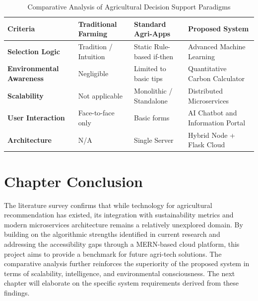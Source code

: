 \documentclass[12pt,a4paper]{report}
\begin{document}
\begin{table}[H]
    \centering
    \renewcommand{\arraystretch}{1.5}
    \begin{tabularx}{\textwidth}{|p{3cm}|X|X|X|}
        \hline
        \textbf{Criteria} & \textbf{Traditional Farming} & \textbf{Standard Agri-Apps} & \textbf{Proposed System} \\
        \hline
        \textbf{Selection Logic} & Tradition / Intuition & Static Rule-based if-then & Advanced Machine Learning \\
        \hline
        \textbf{Environmental Awareness} & Negligible & Limited to basic tips & Quantitative Carbon Calculator \\
        \hline
        \textbf{Scalability} & Not applicable & Monolithic / Standalone & Distributed Microservices \\
        \hline
        \textbf{User Interaction} & Face-to-face only & Basic forms & AI Chatbot and Information Portal \\
        \hline
        \textbf{Architecture} & N/A & Single Server & Hybrid Node + Flask Cloud \\
        \hline
    \end{tabularx}
    \caption{Comparative Analysis of Agricultural Decision Support Paradigms}
\end{table}

\section{Chapter Conclusion}
The literature survey confirms that while technology for agricultural recommendation has existed, its integration with sustainability metrics and modern microservices architecture remains a relatively unexplored domain. By building on the algorithmic strengths identified in current research and addressing the accessibility gaps through a MERN-based cloud platform, this project aims to provide a benchmark for future agri-tech solutions. The comparative analysis further reinforces the superiority of the proposed system in terms of scalability, intelligence, and environmental consciousness. The next chapter will elaborate on the specific system requirements derived from these findings.


\end{document}
